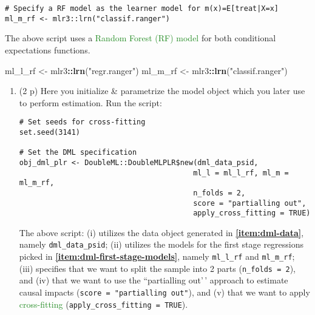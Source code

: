 \documentclass[
]{article}
\newenvironment{Shaded}{\begin{snugshade}}{\end{snugshade}}
\newcommand{\FunctionTok}[1]{\textcolor[rgb]{0.13,0.29,0.53}{\textbf{#1}}}
\newcommand{\NormalTok}[1]{#1}
\newcommand{\OtherTok}[1]{\textcolor[rgb]{0.56,0.35,0.01}{#1}}
\newcommand{\SpecialCharTok}[1]{\textcolor[rgb]{0.81,0.36,0.00}{\textbf{#1}}}
\newcommand{\StringTok}[1]{\textcolor[rgb]{0.31,0.60,0.02}{#1}}
\begin{document}
\begin{enumerate}
\begin{enumerate}
\begin{verbatim}
# Specify a RF model as the learner model for m(x)=E[treat|X=x]
ml_m_rf <- mlr3::lrn("classif.ranger")
\end{verbatim}
  \end{enumerate}

  The above script uses a
  \textcolor{ForestGreen}{Random Forest (RF) model} for both conditional
  expectations functions.

\begin{Shaded}
\begin{Highlighting}[]
\NormalTok{ml\_l\_rf }\OtherTok{\textless{}{-}}\NormalTok{ mlr3}\SpecialCharTok{::}\FunctionTok{lrn}\NormalTok{(}\StringTok{"regr.ranger"}\NormalTok{)}
\NormalTok{ml\_m\_rf }\OtherTok{\textless{}{-}}\NormalTok{ mlr3}\SpecialCharTok{::}\FunctionTok{lrn}\NormalTok{(}\StringTok{"classif.ranger"}\NormalTok{)}
\end{Highlighting}
\end{Shaded}

  \begin{enumerate}
  \def\labelenumii{\alph{enumii}.}
  \setcounter{enumii}{6}
  \item
    (2 p) Here you initialize \& parametrize the model object which you
    later use to perform estimation. Run the script:

\begin{verbatim}
# Set seeds for cross-fitting
set.seed(3141)

# Set the DML specification
obj_dml_plr <- DoubleML::DoubleMLPLR$new(dml_data_psid, 
                                        ml_l = ml_l_rf, ml_m = ml_m_rf, 
                                        n_folds = 2,
                                        score = "partialling out",
                                        apply_cross_fitting = TRUE)
\end{verbatim}

    The above script: (i) utilizes the data object generated in
    \textbf{\ref{item:dml-data}}, namely \texttt{dml\_data\_psid}; (ii)
    utilizes the models for the first stage regressions picked in
    \textbf{\ref{item:dml-first-stage-models}}, namely
    \texttt{ml\_l\_rf} and \texttt{ml\_m\_rf}; (iii) specifies that we
    want to split the sample into 2 parts (\texttt{n\_folds = 2}), and
    (iv) that we want to use the ``partialling out'\,' approach to
    estimate causal impacts (\texttt{score = "partialling out"}), and
    (v) that we want to apply \textcolor{ForestGreen}{cross-fitting}
    (\texttt{apply\_cross\_fitting = TRUE}).\label{item:dml-model}
  \end{enumerate}


\end{enumerate}
\end{document}
